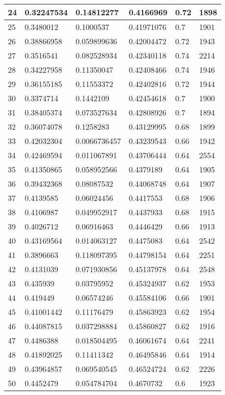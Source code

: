 \begin{longtable}{|l|l|l|l|l|l|}
24 & 0.32247534 & 0.14812277 & 0.4166969 & 0.72 & 1898 \\ \hline 
25 & 0.3480012 & 0.1000537 & 0.41971076 & 0.7 & 1901 \\ \hline 
26 & 0.38866958 & 0.059899636 & 0.42004472 & 0.72 & 1943 \\ \hline 
27 & 0.3516541 & 0.082528934 & 0.42340118 & 0.74 & 2214 \\ \hline 
28 & 0.34227958 & 0.11350047 & 0.42408466 & 0.74 & 1946 \\ \hline 
29 & 0.36155185 & 0.11553372 & 0.42402816 & 0.72 & 1944 \\ \hline 
30 & 0.3374714 & 0.1442109 & 0.42454618 & 0.7 & 1900 \\ \hline 
31 & 0.38405374 & 0.073527634 & 0.42808926 & 0.7 & 1894 \\ \hline 
32 & 0.36074078 & 0.1258283 & 0.43129995 & 0.68 & 1899 \\ \hline 
33 & 0.42032304 & 0.0066736457 & 0.43239543 & 0.66 & 1942 \\ \hline 
34 & 0.42469594 & 0.011067891 & 0.43706444 & 0.64 & 2554 \\ \hline 
35 & 0.41350865 & 0.058952566 & 0.4379189 & 0.64 & 1905 \\ \hline 
36 & 0.39432368 & 0.08087532 & 0.44068748 & 0.64 & 1907 \\ \hline 
37 & 0.4139585 & 0.06024456 & 0.4417553 & 0.68 & 1906 \\ \hline 
38 & 0.4106987 & 0.049952917 & 0.4437933 & 0.68 & 1915 \\ \hline 
39 & 0.4026712 & 0.06916463 & 0.4446429 & 0.66 & 1913 \\ \hline 
40 & 0.43169564 & 0.014063127 & 0.4475083 & 0.64 & 2542 \\ \hline 
41 & 0.3896663 & 0.118097395 & 0.44798154 & 0.64 & 2251 \\ \hline 
42 & 0.4131039 & 0.071930856 & 0.45137978 & 0.64 & 2548 \\ \hline 
43 & 0.435939 & 0.03795952 & 0.45324937 & 0.62 & 1953 \\ \hline 
44 & 0.419449 & 0.06574246 & 0.45584106 & 0.66 & 1901 \\ \hline 
45 & 0.41001442 & 0.11176479 & 0.45863923 & 0.62 & 1954 \\ \hline 
46 & 0.44087815 & 0.037298884 & 0.45860827 & 0.62 & 1916 \\ \hline 
47 & 0.4486388 & 0.018504495 & 0.46061674 & 0.64 & 2241 \\ \hline 
48 & 0.41892025 & 0.11411342 & 0.46495846 & 0.64 & 1914 \\ \hline 
49 & 0.43964857 & 0.069540545 & 0.46524724 & 0.62 & 2226 \\ \hline 
50 & 0.4452479 & 0.054784704 & 0.4670732 & 0.6 & 1923 \\ \hline 
\end{longtable}